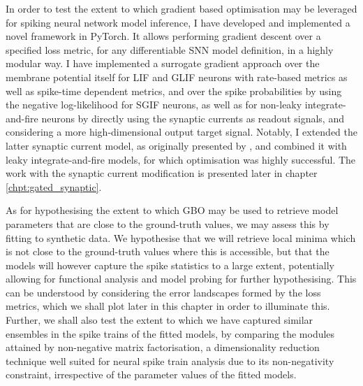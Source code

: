 \documentclass[mphil,deptreport,ianc]{infthesis} %
\begin{document}
In order to test the extent to which gradient based optimisation may be leveraged for spiking neural network model inference, I have developed and implemented a novel framework in PyTorch.
It allows performing gradient descent over a specified loss metric, for any differentiable SNN model definition, in a highly modular way.
I have implemented a surrogate gradient approach over the membrane potential itself for LIF and GLIF neurons with rate-based metrics as well as spike-time dependent metrics, and over the spike probabilities by using the negative log-likelihood for SGIF neurons, as well as for non-leaky integrate-and-fire neurons by directly using the synaptic currents as readout signals, and considering a more high-dimensional output target signal.
Notably, I extended the latter synaptic current model, as originally presented by \cite{Huh2017}, and combined it with leaky integrate-and-fire models, for which optimisation was highly successful. The work with the synaptic current modification is presented later in chapter \ref{chpt:gated_synaptic}.

As for hypothesising the extent to which GBO may be used to retrieve model parameters that are close to the ground-truth values, we may assess this by fitting to synthetic data.
We hypothesise that we will retrieve local minima which is not close to the ground-truth values where this is accessible, but that the models will however capture the spike statistics to a large extent, potentially allowing for functional analysis and model probing for further hypothesising. 
This can be understood by considering the error landscapes formed by the loss metrics, which we shall plot later in this chapter in order to illuminate this.
Further, we shall also test the extent to which we have captured similar ensembles in the spike trains of the fitted models, by comparing the modules attained by non-negative matrix factorisation, a dimensionality reduction technique well suited for neural spike train analysis due to its non-negativity constraint, irrespective of the parameter values of the fitted models.
\end{document}
